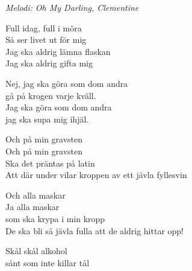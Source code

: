 {\footnotesize\textit{Melodi: Oh My Darling, Clementine}}\par
\vspace{10pt}
Full idag, full i möra\\
Så ser livet ut för mig\\
Jag ska aldrig lämna flaskan \\
Jag ska aldrig gifta mig\par
\vspace{10pt}
Nej, jag ska göra som dom andra\\
gå på krogen varje kväll.\\
Jag ska göra som dom andra\\
jag ska supa mig ihjäl.\par
\vspace{10pt}
Och på min gravsten\\
Och på min gravsten\\
Ska det präntas på latin\\
Att där under vilar kroppen av ett jävla fyllesvin\par
\vspace{10pt}
Och alla maskar\\
Ja alla maskar \\
som ska krypa i min kropp\\
De ska bli så jävla fulla att de aldrig hittar opp!\par
\vspace{10pt}
Skål skål alkohol\\
sånt som inte killar tål

